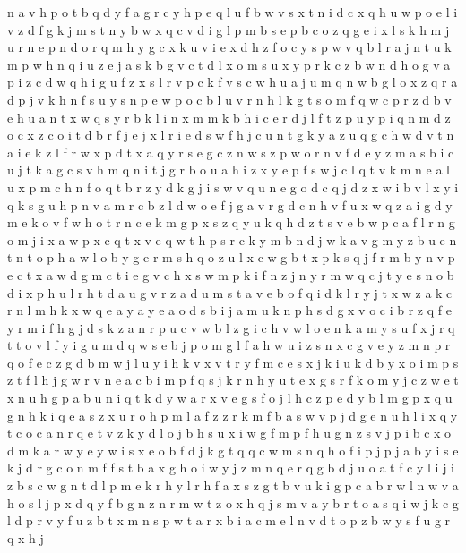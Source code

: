 \documentclass{article}
\begin{document}
n a v
h p o t b q
d y f
a g r c y h p e q l u f b w v s x t n i d
c x q h u w p o e l i v z d f g k j m s t n y b
w x q c v d i g l p m b s e
p b c o z q g e i x l s k h m j u r n
e p n d o r q m h y g c x k u
v
i e x d h z f o c y s p w v q b l r a j n t u k m
p w h n q i u z e j a s k b g v c t d l x o
m s u x y p r k c z b w n d h
o g v a p i z c d w q
h i g u f z x s l r v p c
k f v s c w h u a
j u m
q n
w b g l o x z q r a d p j v k h n f s u y
s n p e
w p o c b l u v r n h
l k g t s o m f q w c p r z d b v e h u a n
t x w q s y r b k l i n
x m
m k b h i c e r d j l f t z p u
y p i q n m d z o c x
z c o i t d b r f j e
j
x l r i e d s w f h j c u n t g k y a z
u q g c h w d v t n a i
e k z l f r w
x
p d t x a q y r s e g c z n w
s z
p w o r n v f d e y z m a s b i c u j t k
a g c s v h m q n i t j
g r b o u a h i z x y e p f s w j c l q t v k m n
e a l u x p m c h n f o q t b r z y d k g j i s w v
q
u n e g o d c
q j d z x w i b v l
x y i q k s g u h p n v a m r c b z l d w o e f j
g a v
r g d
c n h v f u x w q z a i g d y m e k o
v f w h o t r n c e k m g p x s z q y
u k q h d z t s v e b w p c a f l r n g o m j i x
a w p x c q t
x v e q w t h p s r c k y m b n
d j w k a v g m y z b u e n t
n t o p h
a w l o b y g
e r m s h q o z u l x c w g b t
x p k
s q j f r m b y n v p e c t x a w d g
m c
t i e g v c h x s w m
p k i f n
z j n y
r m w q c j t y e s n o b d i x p h u l
r h t d a
u g v r z a d
u m s t a v e b o f q i d k l r y j
t x w z a k c
r n l m h k x w q e a
y a
y e
a o d s b i j
a m u k n p h s d g x v o c i b r z q f e
y r
m i f h g j d s k z a n r p u c v w b l
z g i c h v w l o e n k a m y s u f x j r q t
t o v l f y i g u m d q w s e b j p
o m g l f a h w u i z
s n x c g v e y z m
n p r q o f e c z g d b m w j l u y i h k v x
v t r y f m c e s x j k i
u k d b y x o i m p s z t f l h j g w r v n e a
c b i m p f q s j k r n h y u t e x g
s r f k o m y j c z w e t x n u h g p a
b u n i q t k d y w a r x v e g s f o j l h c z p
e d y b l m g p x q
u g n h k i q e a s z x
u r o h p m l a f z
z r k m f b a s w v p j d g e n u h l i x q y t c o
c a n r q e t v z k y d l o j b h s u x i w g f m p
f h u g n z s v j p i b c x o d m k a r w y e
y w i s x e o b f d j k g t q
q c
w m s n q h o f i p j
p j
a b y i s e k j d r g c o n m f
f s t b a x g h o i w y j z m n q
e r q g b d j u o a t f c y l i
j i z b s c w g n t d l p m e k r h y
l r h f a x s z g t b v u
k i g p c a b r w l n
w v a h o s l j p x d q y f b g n z
n r m w t z
o x h q j s m v a y b r t
o a s q i w j k c g l d p r v y f u z b t x m n
s p w t a r x b i
a c m e l n v d t o p z b w y s f u g r q x h j
\end{document}
